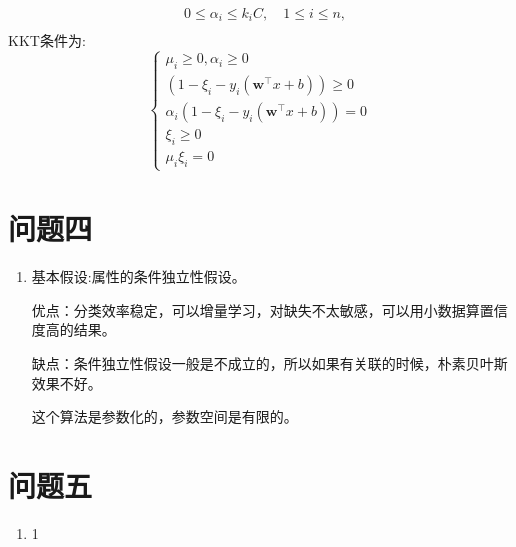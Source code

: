 \documentclass[answers]{exam}  %
\begin{document}
\begin{enumerate}[label=\alph*.]
\begin{align*}
                    & 0 \leq \alpha_i \leq k_i C,\quad 1\leq i\leq n,\\
    \end{align*}
    KKT条件为:
    \begin{equation*}
        \begin{cases*}
            \mu_i \geq 0, \alpha_i \geq 0\\
            (1 - \xi_i - y_i(\mathbf{w}^\top x + b)) \geq 0 \\
            \alpha_i (1 - \xi_i - y_i(\mathbf{w}^\top x + b)) = 0\\
            \xi_i \geq 0 \\
            \mu_i \xi_i = 0
        \end{cases*}
    \end{equation*}
\end{enumerate}

\section{问题四}
\begin{enumerate}[label=\alph*.] 
    \item 基本假设:属性的条件独立性假设。
    \par 优点：分类效率稳定，可以增量学习，对缺失不太敏感，可以用小数据算置信度高的结果。
    \par 缺点：条件独立性假设一般是不成立的，所以如果有关联的时候，朴素贝叶斯效果不好。
    \par 这个算法是参数化的，参数空间是有限的。
\end{enumerate}

\section{问题五}
\begin{enumerate}[label=\alph*.] 
    \item 1
\end{enumerate}
\end{document}
